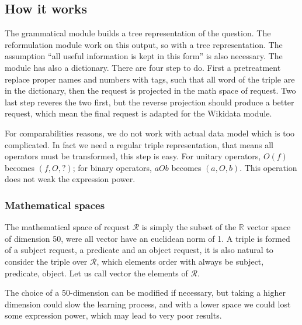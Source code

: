 \subsection{How it works}


The grammatical module builds a tree representation of the question. The reformulation module work on this output, so with a tree representation. The assumption ``all useful information is kept in this form''  is also necessary. The module has also a dictionary. There are four step to do. First a pretreatment replace proper names and numbers with tags, such that all word of the triple are in the dictionary, then the request is projected in the math space of request. Two last step reveres the two first, but the reverse projection should produce a better request, which mean the final request is adapted for the Wikidata module.

For comparabilities reasons, we do not work with actual data model which is too complicated. In fact we need a regular triple representation, that means all operators must be transformed, this step is easy. For unitary operators, $O(f)$ becomes $(f,O,?)$; for binary operators, $aOb$ becomes $(a,O,b)$. This operation does not weak the expression power.

\subsubsection{Mathematical spaces}

The mathematical space of request $\mathcal{R}$ is simply the subset of the $\mathbb{R}$ vector space of dimension 50, were all vector have an euclidean norm of 1.
A triple is formed of a subject request, a predicate and an object request, it is also natural to consider the triple over $\mathcal{R}$, which elements order with always be subject, predicate, object.
Let us call vector the elements of $\mathcal{R}$.

The choice of a 50-dimension can be modified if necessary, but taking a higher dimension could slow the learning process, and with a lower space we could lost some expression power, which may lead to very poor results.



